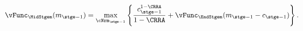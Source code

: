  \begin{equation}\begin{gathered}\begin{aligned}
        {\vFunc}_{\MidStgem}({m}_{\stge-1})   & = \max_{\cNrm_{\stge-1}}
        \left\{
          \frac{{c}_{\stge-1}^{1-\CRRA}}{1-\CRRA} +
          \vFunc_{\EndStgem}({m}_{\stge-1}-{c}_{\stge-1})
        \right\}.
        \label{eq:vEndTm1}
      \end{aligned}\end{gathered}\end{equation}%
